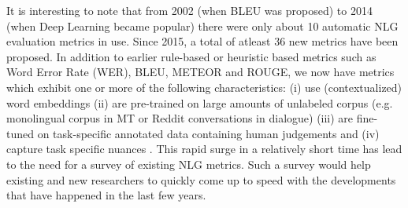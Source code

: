 It is interesting to note that from 2002 (when BLEU was proposed) to 2014 (when Deep Learning became popular) there were only about 10 automatic NLG evaluation metrics in use. Since 2015, a total of atleast 36 new metrics have been proposed. In addition to earlier rule-based or heuristic based metrics such as Word Error Rate (WER), BLEU, METEOR and ROUGE, we now have metrics which exhibit one or more of the following characteristics: (i) use (contextualized) word embeddings  (ii) are pre-trained on large amounts of unlabeled corpus (e.g. monolingual corpus in MT  or Reddit conversations in dialogue) 
(iii) are fine-tuned on task-specific annotated data containing human judgements  and (iv) capture task specific nuances . This rapid surge in a relatively short time has lead to the need for a survey of existing NLG metrics. Such a survey would help existing and new researchers to quickly come up to speed with the developments that have happened in the last few years. 

